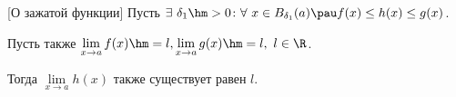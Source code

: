 [О зажатой функции]\label{zaf}
Пусть $\exists\ \delta_1\hm>0\colon \forall\  x\in B_{\delta_1}(a)
\pau f(x)\leq h(x)\leq g(x)$.

Пусть также $
\lim\limits_{x\to a}f(x)\hm=l,
\lim\limits_{x\to a}g(x)\hm=l,\ l\in\R$.

Тогда $\lim\limits_{x\to a}h(x)$ также существует равен $l$.
